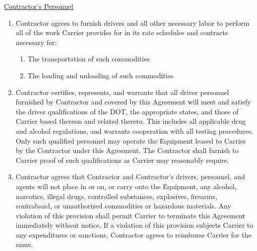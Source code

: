 \newcommand{\PhysicalQualificationsAndExaminationsFootnote}{%
    \textbf{The Office of the Federal Register}:
    \textsl{Title 49 -- Part 391: Subpart E --- Physical Qualifications
    and Examinations} \\
    \href
        {https://www.ecfr.gov/current/title-49/part-391/subpart-E}
        {https://www.ecfr.gov/current/title-49/part-391/subpart-E}
}

\underline{Contractor's Personnel}
\begin{enumerate}[
    ref = \SecondLevelEnumerator
]
    \item Contractor agrees to furnish drivers and all other necessary
    labor to perform all of the work Carrier provides for in its rate
    schedules and contracts necessary for:
    \begin{enumerate}[
        ref = \ThirdLevelEnumerator
    ]
        \item The transportation of such commodities
        
        \item The loading and unloading of such commodities
    \end{enumerate}

    \item Contractor certifies, represents, and warrants that all driver
    personnel furnished by Contractor and covered by this Agreement will
    meet and satisfy the driver qualifications of the DOT, the appropriate
    states, and those of Carrier based thereon and related thereto. This
    includes all applicable drug and alcohol regulations, and warrants
    cooperation with all testing procedures. Only such qualified personnel
    may operate the Equipment leased to Carrier by the Contractor under
    this Agreement. The Contractor shall furnish to Carrier proof of such
    qualifications as Carrier may reasonably require.

    \item Contractor agrees that Contractor and Contractor's drivers,
    personnel, and agents will not place in or on, or carry onto the
    Equipment, any alcohol, narcotics, illegal drugs, controlled
    substances, explosives, firearms, contraband, or unauthorized
    commodities or hazardous materials. Any violation of this provision
    shall permit Carrier to terminate this Agreement immediately without
    notice. If a violation of this provision subjects Carrier to any
    expenditures or sanctions, Contractor agrees to reimburse Carrier for
    the same.


\end{enumerate}
